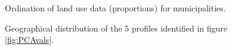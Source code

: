 


\begin{figure}[h!]
\caption{Ordination of land use data (proportions) for municipalities.}
\label{fig:PCAvals}

\caption{Geographical distribution of the 5 profiles identified in figure \ref{fig:PCAvals}.}
\label{fig:mapvals}
\end{figure}


